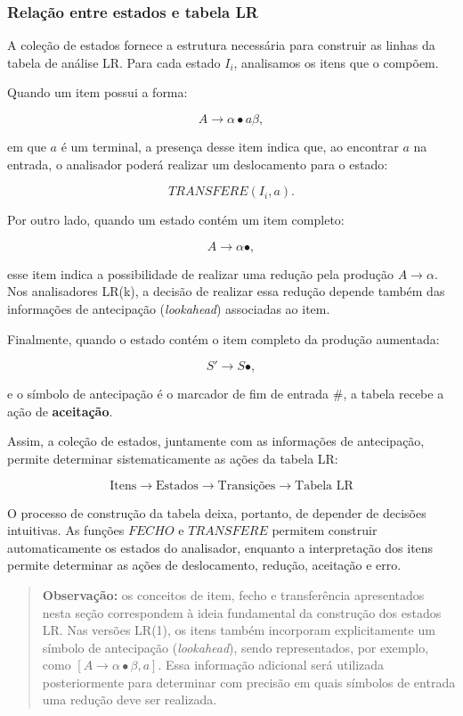 \documentclass[
  brazilian,
  letterpaper,
]{book}
\theoremstyle{plain}
\theoremstyle{definition}
\theoremstyle{remark}
\begin{document}
\subsubsection{Relação entre estados e tabela
LR}\label{relauxe7uxe3o-entre-estados-e-tabela-lr}

A coleção de estados fornece a estrutura necessária para construir as
linhas da tabela de análise LR. Para cada estado \(I_i\), analisamos os
itens que o compõem.

Quando um item possui a forma:

\[
A\rightarrow\alpha\bullet a\beta,
\]

em que \(a\) é um terminal, a presença desse item indica que, ao
encontrar \(a\) na entrada, o analisador poderá realizar um deslocamento
para o estado:

\[
TRANSFERE(I_i,a).
\]

Por outro lado, quando um estado contém um item completo:

\[
A\rightarrow\alpha\bullet,
\]

esse item indica a possibilidade de realizar uma redução pela produção
\(A\rightarrow\alpha\). Nos analisadores LR(k), a decisão de realizar
essa redução depende também das informações de antecipação
(\emph{lookahead}) associadas ao item.

Finalmente, quando o estado contém o item completo da produção
aumentada:

\[
S'\rightarrow S\bullet,
\]

e o símbolo de antecipação é o marcador de fim de entrada \(\#\), a
tabela recebe a ação de \textbf{aceitação}.

Assim, a coleção de estados, juntamente com as informações de
antecipação, permite determinar sistematicamente as ações da tabela LR:

\[
\boxed{
\text{Itens}
\longrightarrow
\text{Estados}
\longrightarrow
\text{Transições}
\longrightarrow
\text{Tabela LR}
}
\]

O processo de construção da tabela deixa, portanto, de depender de
decisões intuitivas. As funções \(FECHO\) e \(TRANSFERE\) permitem
construir automaticamente os estados do analisador, enquanto a
interpretação dos itens permite determinar as ações de deslocamento,
redução, aceitação e erro.

\begin{quote}
\textbf{Observação:} os conceitos de item, fecho e transferência
apresentados nesta seção correspondem à ideia fundamental da construção
dos estados LR. Nas versões LR(1), os itens também incorporam
explicitamente um símbolo de antecipação (\emph{lookahead}), sendo
representados, por exemplo, como \([A\rightarrow\alpha\bullet\beta,a]\).
Essa informação adicional será utilizada posteriormente para determinar
com precisão em quais símbolos de entrada uma redução deve ser
realizada.
\end{quote}
\end{document}
